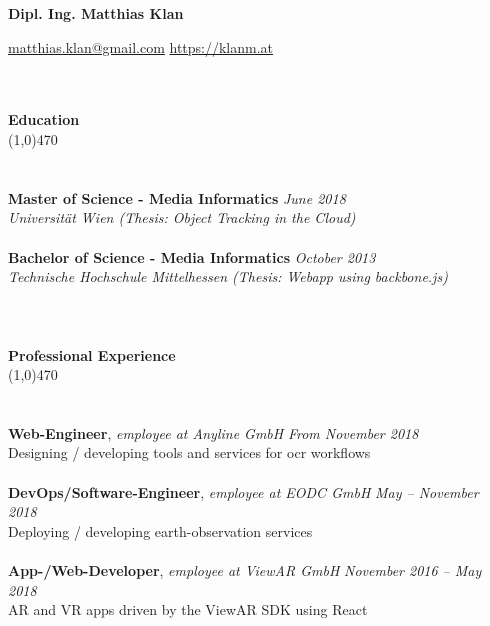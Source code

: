 \documentclass[10pt]{article} %
\begin{document}
\centerline{{\LARGE \bf Dipl. Ing. Matthias Klan}}
\centerline{\href{mailto:matthias.klan@gmail.com}{matthias.klan@gmail.com} \raisebox{0.25ex}{\tiny$\bullet$} \href{https://klanm.at}{https://klanm.at}}

\noindent %
\\\\
{\Large \bf Education}\\
\line(1,0){470}\\
\\\\
\noindent
{\bf Master of Science - Media Informatics} \hfill \textit{June 2018} \\ 
\textit{Universität Wien (Thesis: Object Tracking in the Cloud)}\\\\
\noindent
{\bf Bachelor of Science - Media Informatics} \hfill \textit{October 2013} \\
\textit{Technische Hochschule Mittelhessen (Thesis: Webapp using backbone.js)}\\
\\
\noindent %
\\\\
{\Large \bf Professional Experience}\\
\line(1,0){470}\\
\\\\
\noindent
{\bf Web-Engineer}, \textit{employee at Anyline GmbH}  \hfill \textit{ From November 2018 } \\ 
Designing / developing tools and services for ocr workflows   \\\\
\noindent
\noindent
{\bf DevOps/Software-Engineer}, \textit{employee at EODC GmbH}  \hfill \textit{ May -- November 2018 } \\ 
Deploying / developing earth-observation services\\\\
\noindent
\noindent
{\bf App-/Web-Developer}, \textit{employee at ViewAR GmbH}  \hfill \textit{ November 2016 -- May 2018 } \\ 
AR and VR apps driven by the ViewAR SDK using React\\\\
\noindent
\end{document}
